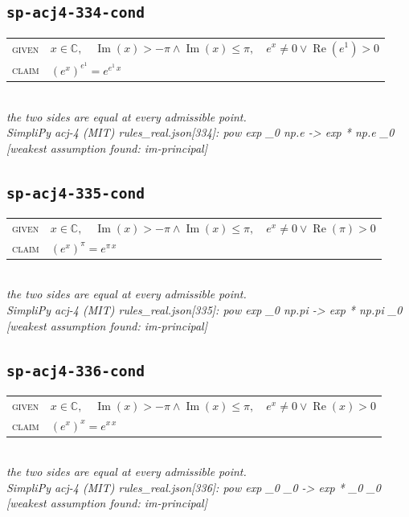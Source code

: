\documentclass[11pt]{article}
\begin{document}
\subsection*{\texttt{sp-acj4-334-cond}}
\begin{tabular}{@{}l@{\quad}l@{}}
\textsc{given} & $x \in \mathbb{C},\quad \operatorname{Im}\left(x\right) > -\pi \land \operatorname{Im}\left(x\right) \le \pi,\quad e^{x} \neq 0 \lor \operatorname{Re}\left(e^{1}\right) > 0$ \\[4pt]
\textsc{claim} & $\displaystyle \left(e^{x}\right)^{e^{1}} = e^{e^{1} \, x}$ \\
\end{tabular}\\[2pt]
{\small\emph{the two sides are equal at every admissible point.}}\\
\emph{SimpliPy acj-4 (MIT) rules\_real.json[334]: pow exp \_0 np.e  ->  exp * np.e \_0  [weakest assumption found: im-principal]}\\

\subsection*{\texttt{sp-acj4-335-cond}}
\begin{tabular}{@{}l@{\quad}l@{}}
\textsc{given} & $x \in \mathbb{C},\quad \operatorname{Im}\left(x\right) > -\pi \land \operatorname{Im}\left(x\right) \le \pi,\quad e^{x} \neq 0 \lor \operatorname{Re}\left(\pi\right) > 0$ \\[4pt]
\textsc{claim} & $\displaystyle \left(e^{x}\right)^{\pi} = e^{\pi \, x}$ \\
\end{tabular}\\[2pt]
{\small\emph{the two sides are equal at every admissible point.}}\\
\emph{SimpliPy acj-4 (MIT) rules\_real.json[335]: pow exp \_0 np.pi  ->  exp * np.pi \_0  [weakest assumption found: im-principal]}\\

\subsection*{\texttt{sp-acj4-336-cond}}
\begin{tabular}{@{}l@{\quad}l@{}}
\textsc{given} & $x \in \mathbb{C},\quad \operatorname{Im}\left(x\right) > -\pi \land \operatorname{Im}\left(x\right) \le \pi,\quad e^{x} \neq 0 \lor \operatorname{Re}\left(x\right) > 0$ \\[4pt]
\textsc{claim} & $\displaystyle \left(e^{x}\right)^{x} = e^{x \, x}$ \\
\end{tabular}\\[2pt]
{\small\emph{the two sides are equal at every admissible point.}}\\
\emph{SimpliPy acj-4 (MIT) rules\_real.json[336]: pow exp \_0 \_0  ->  exp * \_0 \_0  [weakest assumption found: im-principal]}\\
\end{document}
